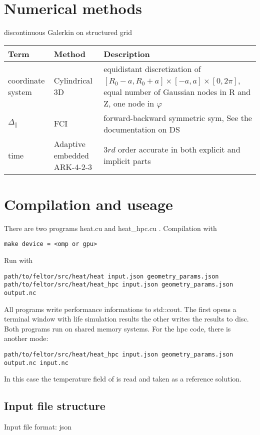 \section{Numerical methods}
discontinuous Galerkin on structured grid
\begin{longtable}{ll>{\RaggedRight}p{7cm}}
\toprule
\rowcolor{gray!50}\textbf{Term} &  \textbf{Method} & \textbf{Description}  \\ \midrule
coordinate system & Cylindrical 3D & equidistant discretization of $[R_0-a,R_0+a] \times [-a,a] \times [0,2\pi]$, equal number of Gaussian nodes in R and Z, one node in $\varphi$ \\
$\Delta_\parallel$ & FCI & forward-backward symmetric sym, See the documentation on DS\\
time &  Adaptive embedded ARK-4-2-3 & $3rd$ order accurate in both
explicit and implicit parts\\
\bottomrule
\end{longtable}

\section{Compilation and useage}
There are two programs heat.cu and heat\_hpc.cu . Compilation with
\begin{verbatim}
make device = <omp or gpu>
\end{verbatim}
Run with
\begin{verbatim}
path/to/feltor/src/heat/heat input.json geometry_params.json
path/to/feltor/src/heat/heat_hpc input.json geometry_params.json output.nc
\end{verbatim}
All programs write performance informations to std::cout.
The first opens a terminal window with life simulation results
the
other writes the results to disc. Both programs run on shared memory
systems.
For the hpc code, there is another mode:
\begin{verbatim}
path/to/feltor/src/heat/heat_hpc input.json geometry_params.json output.nc input.nc
\end{verbatim}
In this case the temperature field of  is read
and taken as a reference solution.


\subsection{Input file structure}
Input file format: json

